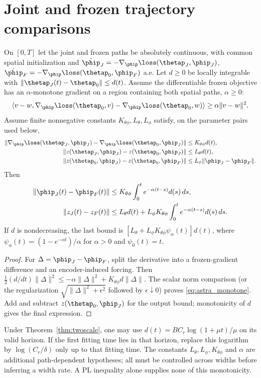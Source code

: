 \section{Joint and frozen trajectory comparisons}
\label{sec:astra_bridges}
\begin{theorem}
\label{thm:astra_monotone}
On $[0,T]$ let the joint and frozen paths be absolutely continuous,
with common spatial initialization and
$\dot\phip_J=-\nabla_\phip\loss(\thetap_J,\phip_J)$,
$\dot\phip_F=-\nabla_\phip\loss(\thetap_0,\phip_F)$ a.e.
Let $d\ge0$ be locally integrable with
$\|\thetap_J(t)-\thetap_0\|\le d(t)$.
Assume the differentiable frozen objective has an $\alpha$-monotone
gradient on a region containing both spatial paths, $\alpha\ge0$:
\[
 \langle v-w,\nabla_\phip\loss(\thetap_0,v)
 -\nabla_\phip\loss(\thetap_0,w)\rangle\ge\alpha\|v-w\|^2.
\]
Assume finite nonnegative constants $K_{\theta\phi},L_\theta,L_\phi$
satisfy, on the parameter pairs used below,
\begin{align*}
 \|\nabla_\phip\loss(\thetap_J,\phip_J)
       -\nabla_\phip\loss(\thetap_0,\phip_J)\|&\le K_{\theta\phi}d(t),\\
 \|z(\thetap_J,\phip_J)-z(\thetap_0,\phip_J)\|&\le L_\theta d(t),\\
 \|z(\thetap_0,\phip_J)-z(\thetap_0,\phip_F)\|&\le L_\phi\|\phip_J-\phip_F\|.
\end{align*}
Then
\begin{align}
 \|\phip_J(t)-\phip_F(t)\|&\le K_{\theta\phi}\int_0^t e^{-\alpha(t-s)}d(s)\,ds,
 \label{eq:astra_monotone}\\
 \|z_J(t)-z_F(t)\|&\le L_\theta d(t)+
 L_\phi K_{\theta\phi}\int_0^t e^{-\alpha(t-s)}d(s)\,ds.
\end{align}
If $d$ is nondecreasing, the last bound is
$[L_\theta+L_\phi K_{\theta\phi}\psi_\alpha(t)]d(t)$, where
$\psi_\alpha(t)=(1-e^{-\alpha t})/\alpha$ for $\alpha>0$ and
$\psi_0(t)=t$.
\end{theorem}
\begin{proof}
For $\Delta=\phip_J-\phip_F$, split the derivative into a frozen-gradient
difference and an encoder-induced forcing. Then
$\frac12(d/dt)\|\Delta\|^2\le-\alpha\|\Delta\|^2+
K_{\theta\phi}d\|\Delta\|$. The scalar norm comparison (or the
regularization $\sqrt{\|\Delta\|^2+\epsilon^2}$ followed by
$\epsilon\downarrow0$) proves \eqref{eq:astra_monotone}. Add and subtract
$z(\thetap_0,\phip_J)$ for the output bound; monotonicity of $d$ gives
the final expression.
\end{proof}
\begin{remark}
Under Theorem~\ref{thm:twoscale}, one may use
$d(t)=BC_r\log(1+\mu t)/\mu$ on its valid horizon. If the first fitting
time lies in that horizon, replace this logarithm by $\log(C_r/\delta)$
only up to that fitting time. The constants $L_\theta,L_\phi,K_{\theta\phi}$
and $\alpha$ are additional path-dependent hypotheses; all must be
controlled across widths before inferring a width rate. A PL inequality
alone supplies none of this monotonicity.
\end{remark}

